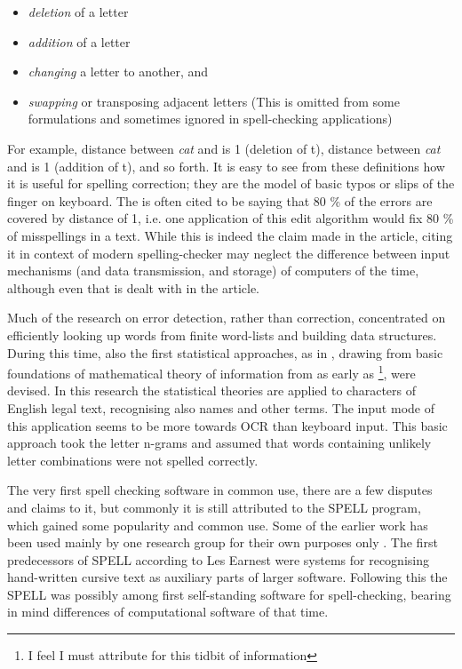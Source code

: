 \documentclass[officiallayout]{unihelcompling}
\newcommand\misspelt{\bgroup\markoverwith
{\textcolor{red}{\lower3.5pt\hbox{\sixly \char58}}}\ULon}
\begin{document}
\begin{itemize}
    \item \emph{deletion} of a letter
    \item \emph{addition} of a letter
    \item \emph{changing} a letter to another, and
    \item \emph{swapping} or transposing adjacent letters
        (This is omitted from some formulations and sometimes ignored in
        spell-checking applications)
\end{itemize}

For example, distance between \emph{cat} and \misspelt{ca} is 1 (deletion of
t), distance between \emph{cat} and \misspelt{catt} is 1 (addition of t), and
so forth.  It is easy to see from these definitions how it is useful for
spelling correction; they are the model of basic typos or slips of the finger
on keyboard. The \citep{damerau1964technique} is often cited to be saying that
80 \% of the errors are covered by distance of 1, i.e. one application of this
edit algorithm would fix 80 \% of misspellings in a text. While this is indeed
the claim made in the article, citing it in context of modern spelling-checker
may neglect the difference between input mechanisms (and data transmission, and
storage) of computers of the time, although even that is dealt with in the
article.

Much of the research on error detection, rather than correction, concentrated
on efficiently looking up words from finite word-lists and building data
structures\citep{}. During this time, also the first statistical approaches, as
in \citep{raviv1967decision}, drawing from basic foundations of mathematical
theory of information from as early as
\citep{shannon1948mathematical}\footnote{I feel I must attribute
\citep{liberman2012noisily} for this tidbit of information}, were devised. In
this research the statistical theories are applied to characters of English
legal text, recognising also names and other terms. The input mode of this
application seems to be more towards OCR than keyboard input. This basic approach took the letter n-grams and assumed that words
containing unlikely letter combinations were not spelled correctly.

The very first spell checking software in common use, there are a few disputes
and claims to it, but commonly it is still attributed to the SPELL
program\citep{gorin1971spell}, which gained some popularity and common use. Some
of the earlier work has been used mainly by one research group for their own
purposes only \citep{earnest2011first,earnest2012first}. The first predecessors
of SPELL according to Les Earnest were systems for recognising hand-written
cursive text as auxiliary parts of larger software. Following this the SPELL
was possibly among first self-standing software for spell-checking, bearing in
mind differences of computational software of that time.
\end{document}

